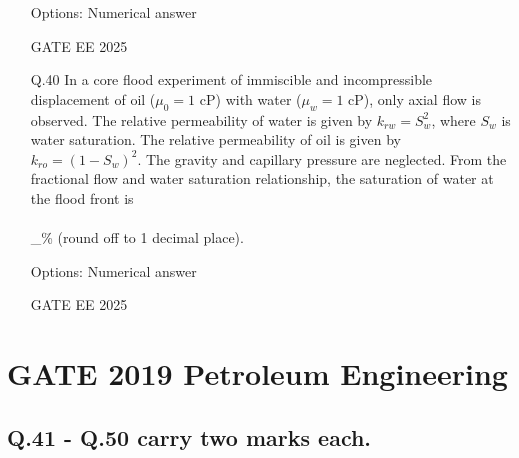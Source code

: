 \documentclass{article}
\begin{document}
\begin{enumerate}[leftmargin=*,series=q]
Options: Numerical answer

GATE EE 2025
 \vspace{0.5cm} 
\item[Q.40] In a core flood experiment of immiscible and incompressible displacement of oil ($\mu_0 = 1$ cP) with water ($\mu_w = 1$ cP), only axial flow is observed. The relative permeability of water is given by $k_{rw} = S_w^2$, where $S_w$ is water saturation. The relative permeability of oil is given by $k_{ro} = (1 - S_w)^2$. The gravity and capillary pressure are neglected. From the fractional flow and water saturation relationship, the saturation of water at the flood front is \\\\\_\% (round off to 1 decimal place).

Options: Numerical answer

GATE EE 2025
 \vspace{0.5cm} 
\end{enumerate}


\section*{GATE 2019 Petroleum Engineering}

\subsection*{Q.41 - Q.50 carry two marks each.}
\end{document}
